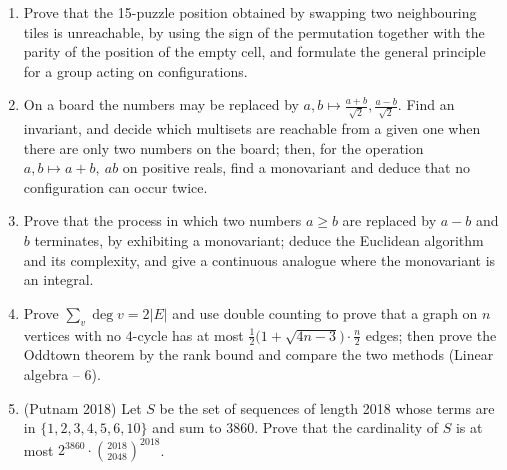 \documentclass[11pt,a4paper]{article}
\renewcommand{\ge}{\geqslant}
\begin{document}
\begin{enumerate}[itemsep=0.4em,topsep=7.4pt]
\item Prove that the 15-puzzle position obtained by swapping two neighbouring tiles is
unreachable, by using the sign of the permutation together with the parity of the position of the
empty cell, and formulate the general principle for a group acting on configurations.

\item On a board the numbers may be replaced by $a,b\mapsto\frac{a+b}{\sqrt2},\frac{a-b}{\sqrt2}$.
Find an invariant, and decide which multisets are reachable from a given one when there are only
two numbers on the board; then, for the operation $a,b\mapsto a+b,\ ab$ on positive reals, find a
monovariant and deduce that no configuration can occur twice.

\item Prove that the process in which two numbers $a\ge b$ are replaced by $a-b$ and $b$
terminates, by exhibiting a monovariant; deduce the Euclidean algorithm and its complexity, and
give a continuous analogue where the monovariant is an integral.

\item Prove $\sum_v\deg v=2|E|$ and use double counting to prove that a graph on $n$ vertices with
no $4$-cycle has at most $\frac12\bigl(1+\sqrt{4n-3}\bigr)\cdot\frac n2$ edges; then prove the
Oddtown theorem by the rank bound and compare the two methods (Linear algebra -- 6).

\item (Putnam 2018) Let $S$ be the set of sequences of length 2018 whose terms are in
$\{1,2,3,4,5,6,10\}$ and sum to 3860. Prove that the cardinality of $S$ is at most
$2^{3860}\cdot\binom{2018}{2048}^{2018}$.
\end{enumerate}
\end{document}
